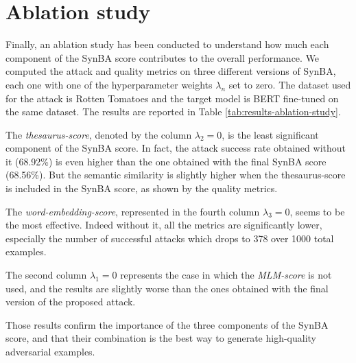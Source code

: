 \section{Ablation study}\label{sec:ablation-study}

Finally, an ablation study has been conducted to understand how much each component of the SynBA score contributes to the overall performance. 
We computed the attack and quality metrics on three different versions of SynBA, each one with one of the hyperparameter weights $\lambda_n$ set to zero.
The dataset used for the attack is Rotten Tomatoes and the target model is BERT fine-tuned on the same dataset.
The results are reported in Table \ref{tab:results-ablation-study}.

The \emph{thesaurus-score}, denoted by the column $\lambda_2=0$, is the least significant component of the SynBA score. In fact, the attack success rate obtained without it (68.92\%) is even higher than the one obtained with the final SynBA score (68.56\%).
But the semantic similarity is slightly higher when the thesaurus-score is included in the SynBA score, as shown by the quality metrics.

The \emph{word-embedding-score}, represented in the fourth column $\lambda_3=0$, seems to be the most effective. Indeed without it, all the metrics are significantly lower, especially the number of successful attacks which drops to 378 over 1000 total examples.

The second column $\lambda_1=0$ represents the case in which the \emph{MLM-score} is not used, and the results are slightly worse than the ones obtained with the final version of the proposed attack.

Those results confirm the importance of the three components of the SynBA score, and that their combination is the best way to generate high-quality adversarial examples.

